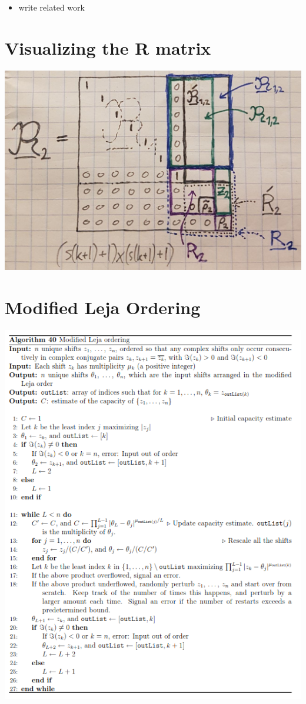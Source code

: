 \documentclass{scrartcl}
\numberwithin{equation}{section}
\begin{document}
\begin{appendices}
\begin{itemize}
\item write related work


\end{itemize}

\section{Visualizing the R matrix}\label{app:R_2}
\begin{center}
	\includegraphics[scale=0.5]{visualize_R2.png}
\end{center}
\section{Modified Leja Ordering}\label{app:MLO}
\begin{center}
	\includegraphics[scale=1.3]{ModifiedLejaOrdering.png}
\end{center}

\end{appendices}
\end{document}
